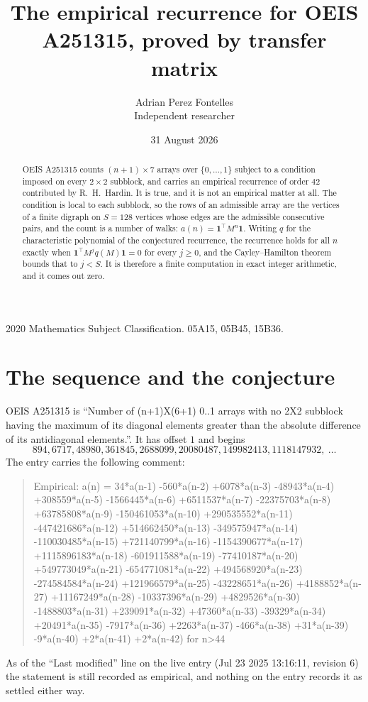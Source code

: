 \documentclass[11pt,a4paper]{article}
\title{The empirical recurrence for OEIS A251315, proved by transfer matrix}
\author{Adrian Perez Fontelles\\ \small Independent researcher}
\date{31 August 2026}
\theoremstyle{plain}
\theoremstyle{definition}
\begin{document}
\maketitle

\begin{abstract}
OEIS A251315 counts $(n+1)\times7$ arrays over $\{0,\dots,1\}$ subject to a condition imposed on
every $2\times2$ subblock, and carries an empirical recurrence of order $42$ contributed
by R.~H.~Hardin. It is true, and it is not an empirical matter at all. The condition is local
to each subblock, so the rows of an admissible array are the vertices of a finite digraph
on $S=128$ vertices whose edges are the admissible consecutive pairs, and the count is a
number of walks: $a(n)=\mathbf{1}^{\!\top}M^{n}\mathbf{1}$. Writing $q$
for the characteristic polynomial of the conjectured recurrence, the recurrence holds for all
$n$ exactly when $\mathbf{1}^{\!\top}M^{j}q(M)\mathbf{1}=0$ for every $j\ge0$, and the
Cayley--Hamilton theorem bounds that to $j<S$. It is therefore a finite computation in exact
integer arithmetic, and it comes out zero.
\end{abstract}

\noindent\small 2020 Mathematics Subject Classification. 05A15, 05B45, 15B36.\normalsize

\section{The sequence and the conjecture}

OEIS A251315 is ``Number of (n+1)X(6+1) 0..1 arrays with no 2X2 subblock having the maximum of its diagonal elements greater than the absolute difference of its antidiagonal elements.''. It has offset $1$ and begins
\[
894, 6717, 48980, 361845, 2688099, 20080487, 149982413, 1118147932,\ \dots
\]
The entry carries the following comment:
\begin{quote}\small
Empirical: a(n) = 34*a(n-1) -560*a(n-2) +6078*a(n-3) -48943*a(n-4) +308559*a(n-5) -1566445*a(n-6) +6511537*a(n-7) -22375703*a(n-8) +63785808*a(n-9) -150461053*a(n-10) +290535552*a(n-11) -447421686*a(n-12) +514662450*a(n-13) -349575947*a(n-14) -110030485*a(n-15) +721140799*a(n-16) -1154390677*a(n-17) +1115896183*a(n-18) -601911588*a(n-19) -77410187*a(n-20) +549773049*a(n-21) -654771081*a(n-22) +494568920*a(n-23) -274584584*a(n-24) +121966579*a(n-25) -43228651*a(n-26) +4188852*a(n-27) +11167249*a(n-28) -10337396*a(n-29) +4829526*a(n-30) -1488803*a(n-31) +239091*a(n-32) +47360*a(n-33) -39329*a(n-34) +20491*a(n-35) -7917*a(n-36) +2263*a(n-37) -466*a(n-38) +31*a(n-39) -9*a(n-40) +2*a(n-41) +2*a(n-42) for n>44
\end{quote}
As of the ``Last modified'' line on the live entry (Jul 23 2025 13:16:11, revision 6) the statement is
still recorded as empirical, and nothing on the entry records it as settled either way.
\end{document}
